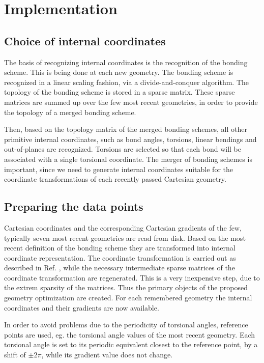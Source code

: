 \documentclass[prl,aps,twocolumn,showpacs,twocolumngrid,superbib]{revtex4}
\begin{document}
\section{Implementation}
\subsection{Choice of internal coordinates}
The basis of recognizing internal coordinates is the recognition
of the bonding scheme. This is being done at each new geometry.
The bonding scheme is recognized in a linear scaling fashion, via
a divide-and-conquer algorithm. The topology of the bonding scheme
is stored in a sparse matrix. These sparse matrices are summed
up over the few most recent geometries, in order to provide
the topology of a merged bonding scheme.

Then, based on the topology matrix of the merged bonding schemes,
all other primitive internal coordinates, such as bond angles,
torsions, linear bendings and out-of-planes are recognized. Torsions
are selected so that each bond will be associated with a single
torsional coordinate.
The merger of bonding schemes is important, since we need to
generate internal coordinates suitable for the coordinate
transformations of each recently passed Cartesian geometry.

\subsection{Preparing the data points}
Cartesian coordinates and the corresponding Cartesian gradients
of the few, typically seven most recent geometries are read from 
disk. Based on the most recent definition of the bonding scheme
they are transformed into internal coordinate representation.
The coordinate transformation is carried out as described in Ref.
\cite{nemeth_coordtrf1}, while the necessary intermediate sparse
matrices of the coordinate transformation are regenerated. This
is a very inexpensive step, due to the extrem sparsity
of the matrices.
Thus the primary objects of the proposed geometry optimization
are created. For each remembered geometry the internal coordinates
and their gradients are now available.

In order to avoid problems due to the periodicity of torsional angles,
reference points are used, eg. the torsional angle values 
of the most recent geometry. Each torsional angle is
set to its periodic equivalent 
closest to the reference point, by a 
shift of $\pm 2\pi$, while its gradient value does not change.
\end{document}
